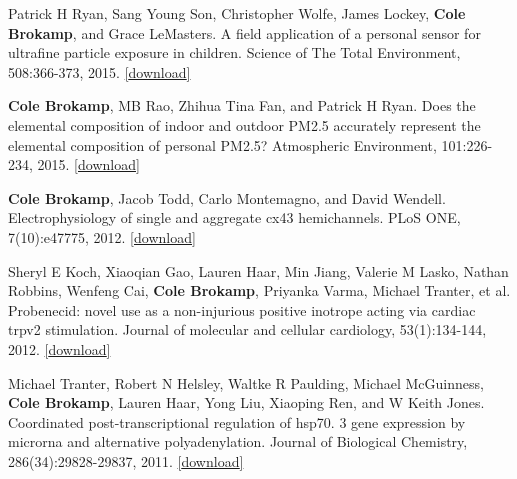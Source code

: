 Patrick H Ryan, Sang Young Son, Christopher Wolfe, James Lockey,
\textbf{Cole Brokamp}, and Grace LeMasters. A field application of a
personal sensor for ultrafine particle exposure in children. Science of
The Total Environment, 508:366-373, 2015.
\href{https://github.com/cole-brokamp/cole-brokamp.github.io/raw/master/publications/1-s2.0-S0048969714016556-main.pdf}{{[}download{]}}

\textbf{Cole Brokamp}, MB Rao, Zhihua Tina Fan, and Patrick H Ryan. Does
the elemental composition of indoor and outdoor PM2.5 accurately
represent the elemental composition of personal PM2.5? Atmospheric
Environment, 101:226-234, 2015.
\href{https://github.com/cole-brokamp/cole-brokamp.github.io/raw/master/publications/1-s2.0-S1352231014008814-main.pdf}{{[}download{]}}

\textbf{Cole Brokamp}, Jacob Todd, Carlo Montemagno, and David Wendell.
Electrophysiology of single and aggregate cx43 hemichannels. PLoS ONE,
7(10):e47775, 2012.
\href{https://github.com/cole-brokamp/cole-brokamp.github.io/raw/master/publications/journal.pone.0047775.pdf}{{[}download{]}}

Sheryl E Koch, Xiaoqian Gao, Lauren Haar, Min Jiang, Valerie M Lasko,
Nathan Robbins, Wenfeng Cai, \textbf{Cole Brokamp}, Priyanka Varma,
Michael Tranter, et al. Probenecid: novel use as a non-injurious
positive inotrope acting via cardiac trpv2 stimulation. Journal of
molecular and cellular cardiology, 53(1):134-144, 2012.
\href{https://github.com/cole-brokamp/cole-brokamp.github.io/raw/master/publications/nihms-373871.pdf}{{[}download{]}}

Michael Tranter, Robert N Helsley, Waltke R Paulding, Michael
McGuinness, \textbf{Cole Brokamp}, Lauren Haar, Yong Liu, Xiaoping Ren,
and W Keith Jones. Coordinated post-transcriptional regulation of hsp70.
3 gene expression by microrna and alternative polyadenylation. Journal
of Biological Chemistry, 286(34):29828-29837, 2011.
\href{https://github.com/cole-brokamp/cole-brokamp.github.io/raw/master/publications/J.\%20Biol.\%20Chem.-2011-Tranter-29828-37.pdf}{{[}download{]}}

